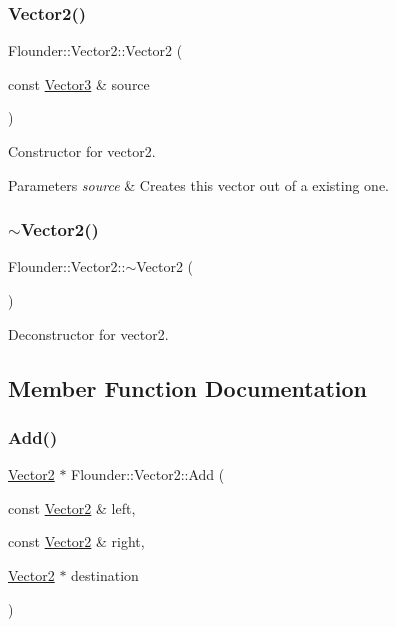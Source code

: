 \subsubsection{\texorpdfstring{Vector2()}{Vector2()}\hspace{0.1cm}{\footnotesize\ttfamily [4/4]}}
{\footnotesize\ttfamily Flounder\+::\+Vector2\+::\+Vector2 (\begin{DoxyParamCaption}\item[{const \hyperlink{class_flounder_1_1_vector3}{Vector3} \&}]{source }\end{DoxyParamCaption})}



Constructor for vector2. 


\begin{DoxyParams}{Parameters}
{\em source} & Creates this vector out of a existing one. \\
\hline
\end{DoxyParams}
\mbox{\label{class_flounder_1_1_vector2_ae515d367363f696544278f2e8d77819a}} 
\subsubsection{\texorpdfstring{$\sim$\+Vector2()}{~Vector2()}}
{\footnotesize\ttfamily Flounder\+::\+Vector2\+::$\sim$\+Vector2 (\begin{DoxyParamCaption}{ }\end{DoxyParamCaption})}



Deconstructor for vector2. 



\subsection{Member Function Documentation}
\mbox{\label{class_flounder_1_1_vector2_ac557b2f71b59d1f03caf6312f8bf58bd}} 
\subsubsection{\texorpdfstring{Add()}{Add()}}
{\footnotesize\ttfamily \hyperlink{class_flounder_1_1_vector2}{Vector2} $\ast$ Flounder\+::\+Vector2\+::\+Add (\begin{DoxyParamCaption}\item[{const \hyperlink{class_flounder_1_1_vector2}{Vector2} \&}]{left,  }\item[{const \hyperlink{class_flounder_1_1_vector2}{Vector2} \&}]{right,  }\item[{\hyperlink{class_flounder_1_1_vector2}{Vector2} $\ast$}]{destination }\end{DoxyParamCaption})\hspace{0.3cm}{\ttfamily [static]}}



